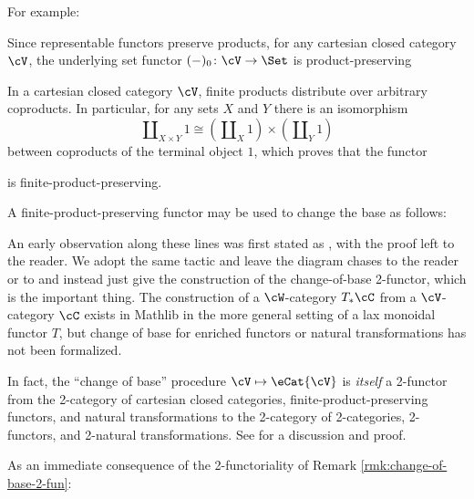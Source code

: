 For example:


\begin{ex}\label{ex:lax-u-set} Since representable functors preserve products, for any cartesian closed category $\cV$, the underlying set functor $(-)_0 \colon \cV \to \Set$ is product-preserving
\end{ex}

\begin{ex}\label{ex:strong-free} In a cartesian closed category $\cV$, finite products distribute over arbitrary coproducts. In particular, for any sets $X$ and $Y$ there is an isomorphism
\[ \amalg_{X \times Y} 1 \cong (\amalg_X 1) \times (\amalg_Y 1)\] between coproducts of the terminal object $1$, which proves that the functor
\begin{center}
\end{center} is finite-product-preserving.
\end{ex}

A finite-product-preserving functor may be used to change the base as follows:


An early observation along these lines was first stated as \cite[II.6.3]{EilenbergKelly:1966cc}, with the proof left to the reader. We adopt the same tactic and leave the diagram chases to the reader or to \cite[4.2.4]{Cruttwell:2008rr} and instead just give the construction of the change-of-base 2-functor, which is the important thing. The construction of a $\cW$-category $T_*\cC$ from a $\cV$-category $\cC$ exists in Mathlib in the more general setting of a lax monoidal functor $T$, but change of base for enriched functors or natural transformations has not been formalized.




\begin{rmk}\label{rmk:change-of-base-2-fun} In fact, the ``change of base'' procedure $\cV \mapsto \eCat{\cV}$ is \emph{itself} a 2-functor from the 2-category of cartesian closed categories, finite-product-preserving functors, and natural transformations to the 2-category of 2-cat\-e\-go\-ries, 2-functors, and 2-natural transformations. See \cite[\S 4.3]{Cruttwell:2008rr} for a discussion and proof.
\end{rmk}


As an immediate consequence of the 2-functoriality of Remark \ref{rmk:change-of-base-2-fun}:


